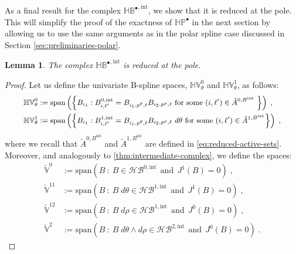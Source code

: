 \documentclass[10pt]{article}
\newcommand{\spaceSpan}[1]{\ensuremath{\text{span}}\left(#1\right)}
\newcommand{\basis}[1]{\mathcal{#1}}
\newcommand{\vSpace}[1]{\mathbb{#1}}
\newcommand{\complex}[1]{\mathit{\vSpace{#1}^\bullet}}
\newcommand{\cU}{\theta}
\newcommand{\cV}{\rho}
\newcommand{\dcU}{\mathit{d\cU}}
\newcommand{\dcV}{\mathit{d\cV}}
\newcommand{\degU}{p^\cU}
\newcommand{\degV}{p^\cV}
\newcommand{\bsp}{B}
\newcommand{\polar}{P}
\newcommand{\jet}[2]{J^{#1}\left(#2\right)}
\newcommand{\tint}{\mathrm{int}}
\newcommand{\hSpace}[1]{\mathit{\vSpace{H}\vSpace{#1}}}
\newcommand{\hBasis}[1]{\mathit{\basis{H}\basis{#1}}}
\newcommand{\hintComplex}{\complex{H\bsp}^{,\tint}}
\newcommand{\hpolarComplex}{\complex{H\polar}}
\newcommand{\ractiveS}[2]{\tilde{A}^{#1}_{#2}}
\theoremstyle{plain}
\newtheorem{lemma}{Lemma}[section]
\theoremstyle{definition}
\theoremstyle{remark}
\begin{document}
As a final result for the complex $\hintComplex$, we show that it is reduced at the pole.
This will simplify the proof of the exactness of $\hpolarComplex$ in the next section by allowing us to use the same arguments as in the polar spline case discussed in Section \ref{sec:preliminaries-polar}.
\begin{lemma}\label{lem:intermediate-reduced-complex}
    The complex $\hintComplex$ is reduced at the pole.
\end{lemma}
\begin{proof}	
    Let us define the univariate B-spline spaces, $\hSpace{V}_\cU^0$ and $\hSpace{V}_\cU^1$, as follows:
    \begin{equation}\label{eq:reduced-spaces-at-pole}
        \small
        \begin{split}
            \hSpace{V}_\cU^0 &:= \spaceSpan{
                \left\{
                    \bsp_{i_1} : \bsp^{0,\tint}_{i,\ell'} = \bsp_{i_1,\degU,\ell}\bsp_{i_2,\degV,\ell}\text{ for some }(i,\ell') \in \ractiveS{0,\bsp^\tint}{}\;
                \right\}
            }\;,\\
            \hSpace{V}_\cU^1 &:= \spaceSpan{
                \left\{
                    \bsp_{i_1} : \bsp^{1,\tint}_{i,\ell'} = \bsp_{i_1,\degU,\ell}\bsp_{i_2,\degV,\ell}\;\dcU\text{ for some }(i,\ell') \in \ractiveS{1,\bsp^\tint}{}
                \right\}
            }\;,
        \end{split}
    \end{equation}
    where we recall that $\ractiveS{0,\bsp^\tint}{}$ and $\ractiveS{1,\bsp^\tint}{}$ are defined in \cref{eq:reduced-active-sets}.
    Moreover, and analogously to \cref{thm:intermediate-complex}, we define the spaces:
    \begin{equation*}
        \begin{split}
            \check{\vSpace{V}}^0 &:= \spaceSpan{B~:~B \in \hBasis{\bsp}^{0,\tint}
            ~~\text{and}~~
            \jet{1}{B} = 0}\;,\\
            \check{\vSpace{V}}^{11} &:= \spaceSpan{B~:~B\;\dcU \in \hBasis{\bsp}^{1,\tint}
            ~~\text{and}~~
            \jet{1}{B} = 0}\;,\\
            \check{\vSpace{V}}^{12} &:= \spaceSpan{B~:~B\;\dcV \in \hBasis{\bsp}^{1,\tint}
            ~~\text{and}~~
            \jet{0}{B} = 0}\;,\\
            \check{\vSpace{V}}^2 &:= \spaceSpan{B~:~B\;\dcU\wedge\dcV \in \hBasis{\bsp}^{2,\tint}
            ~~\text{and}~~
            \jet{0}{B} = 0}\;.

\end{split}
\end{equation*}
\end{proof}
\end{document}
